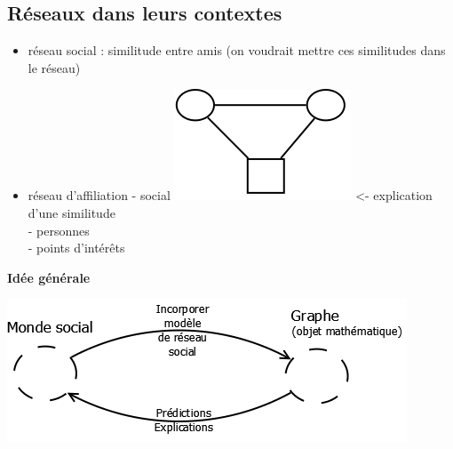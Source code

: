 \subsection{Réseaux dans leurs contextes}
\begin{itemize}
\item réseau social : similitude entre amis (on voudrait mettre ces similitudes dans le réseau)
\item réseau d'affiliation - social \includegraphics[scale=0.2]{images/21_Sim.png} <- explication d'une similitude \\
	- personnes \\
	- points d'intérêts 
\end{itemize}

\textbf{Idée générale}

\includegraphics[scale=0.4]{images/21_IdeeGenerale.png}

